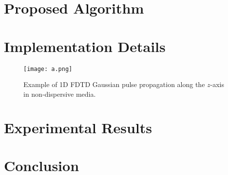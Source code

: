 \documentclass{article}[12pt]
\theoremstyle{plain}
\begin{document}
\section{Proposed Algorithm}
\label{section:proposed_algorithm}
\begin{algorithm}

\end{algorithm}

\section{Implementation Details}
\begin{figure}
\begin{center}
\texttt{[image: a.png]}
\caption{Example of 1D FDTD Gaussian pulse propagation along the $z$-axis in non-dispersive media.}
\label{fig:1D-FDTD}
\end{center}
\end{figure}
\section{Experimental Results}

\section{Conclusion}



\end{document}
